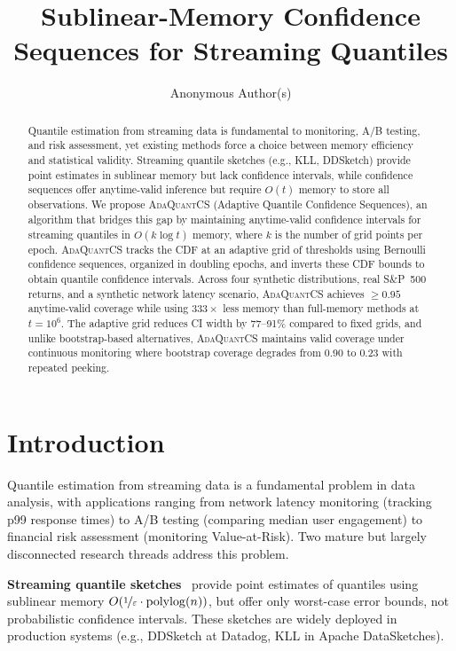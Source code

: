 \documentclass{article}
\title{Sublinear-Memory Confidence Sequences for Streaming Quantiles}
\author{
  Anonymous Author(s)
}
\newcommand{\ours}{\textsc{AdaQuantCS}}
\begin{document}
\maketitle

\begin{abstract}
Quantile estimation from streaming data is fundamental to monitoring, A/B testing, and risk assessment, yet existing methods force a choice between memory efficiency and statistical validity. Streaming quantile sketches (e.g., KLL, DDSketch) provide point estimates in sublinear memory but lack confidence intervals, while confidence sequences offer anytime-valid inference but require $O(t)$ memory to store all observations. We propose \ours{} (Adaptive Quantile Confidence Sequences), an algorithm that bridges this gap by maintaining anytime-valid confidence intervals for streaming quantiles in $O(k \log t)$ memory, where $k$ is the number of grid points per epoch. \ours{} tracks the CDF at an adaptive grid of thresholds using Bernoulli confidence sequences, organized in doubling epochs, and inverts these CDF bounds to obtain quantile confidence intervals. Across four synthetic distributions, real S\&P~500 returns, and a synthetic network latency scenario, \ours{} achieves $\geq 0.95$ anytime-valid coverage while using $333\times$ less memory than full-memory methods at $t = 10^6$. The adaptive grid reduces CI width by 77--91\% compared to fixed grids, and unlike bootstrap-based alternatives, \ours{} maintains valid coverage under continuous monitoring where bootstrap coverage degrades from 0.90 to 0.23 with repeated peeking.
\end{abstract}

\section{Introduction}

Quantile estimation from streaming data is a fundamental problem in data analysis, with applications ranging from network latency monitoring (tracking p99 response times) to A/B testing (comparing median user engagement) to financial risk assessment (monitoring Value-at-Risk). Two mature but largely disconnected research threads address this problem.

\textbf{Streaming quantile sketches}~\citep{greenwald2001space, karnin2016optimal, masson2019ddsketch} provide point estimates of quantiles using sublinear memory $O(\nicefrac{1}{\varepsilon} \cdot \mathrm{polylog}(n))$, but offer only worst-case error bounds, not probabilistic confidence intervals. These sketches are widely deployed in production systems (e.g., DDSketch at Datadog, KLL in Apache DataSketches).
\end{document}
